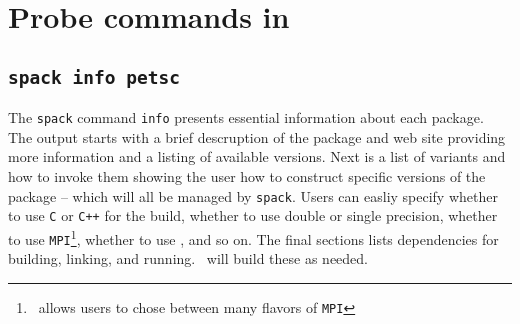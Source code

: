 \documentclass[10pt, oneside]{article}   	%
\begin{document}
\section{Probe commands in \spack}

\subsection{\texttt{spack info petsc}}
The \texttt{spack} command \texttt{info} presents essential information about each package. The output starts with a brief descruption of the package and web site providing more information and a listing of available versions. Next is a list of variants and how to invoke them showing the user how to construct specific versions of the package -- which will all be managed by \texttt{spack}.  Users can easliy specify whether to use \texttt{C} or \texttt{C++} for the build, whether to use double or single precision, whether to use \texttt{MPI}\footnote{\spack \ allows users to chose between many flavors of \texttt{MPI}}, whether to use \openmp, and so on. The final sections lists dependencies for building, linking, and running. \spack \ will build these as needed.

	
\end{document}
